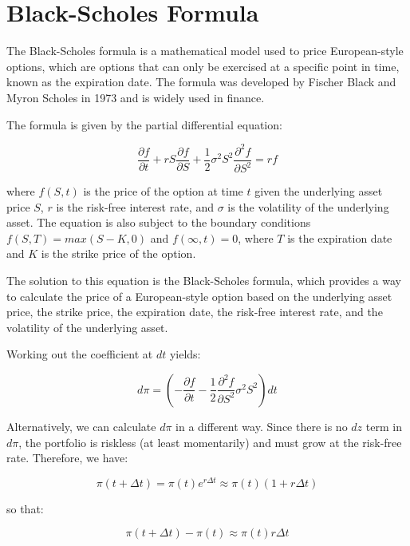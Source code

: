 \documentclass{article}
\theoremstyle{mytheoremstyle}
\theoremstyle{mytheoremstyle}
\theoremstyle{myproblemstyle}
\begin{document}
\section{Black-Scholes Formula}

The Black-Scholes formula is a mathematical model used to price European-style options, which are options that can only be exercised at a specific point in time, known as the expiration date. The formula was developed by Fischer Black and Myron Scholes in 1973 and is widely used in finance.

The formula is given by the partial differential equation:

\begin{equation}
\frac{\partial f}{\partial t} + rS \frac{\partial f}{\partial S} + \frac{1}{2} \sigma^2 S^2 \frac{\partial^2 f}{\partial S^2} = rf
\end{equation}

where $f(S,t)$ is the price of the option at time $t$ given the underlying asset price $S$, $r$ is the risk-free interest rate, and $\sigma$ is the volatility of the underlying asset. The equation is also subject to the boundary conditions $f(S,T) = max(S-K, 0)$ and $f(\infty,t) = 0$, where $T$ is the expiration date and $K$ is the strike price of the option.

The solution to this equation is the Black-Scholes formula, which provides a way to calculate the price of a European-style option based on the underlying asset price, the strike price, the expiration date, the risk-free interest rate, and the volatility of the underlying asset.

Working out the coefficient at $dt$ yields:

\begin{equation}
d\pi = \left(-\frac{\partial f}{\partial t} - \frac{1}{2} \frac{\partial^2 f}{\partial S^2} \sigma^2 S^2\right)dt
\end{equation}

Alternatively, we can calculate $d\pi$ in a different way. Since there is no $dz$ term in $d\pi$, the portfolio is riskless (at least momentarily) and must grow at the risk-free rate. Therefore, we have:

\begin{equation}
\pi(t + \Delta t) = \pi(t) e^{r\Delta t} \approx \pi(t)(1+r\Delta t)
\end{equation}

so that:

\begin{equation}
\pi(t + \Delta t) - \pi(t) \approx \pi(t)r\Delta t
\end{equation}
\end{document}
